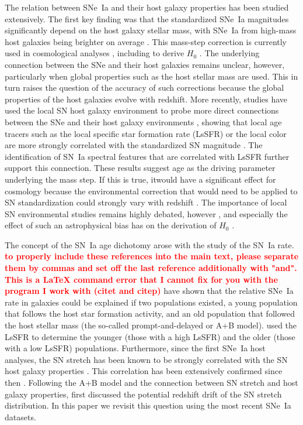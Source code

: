 \documentclass[]{aa}
\newcommand{\LEt}[1]{\textcolor{red}{\textbf{ #1}}}
\begin{document}
The relation between SNe~Ia and their host galaxy properties has been studied
extensively. The first key finding was that the standardized SNe~Ia magnitudes
significantly depend on the host galaxy stellar mass, with SNe~Ia from high-mass
host galaxies being brighter on average \cite[e.g.,][]{kelly2010, sullivan2010,
childress2013, betoule2014, kim19, smith2020}. This mass-step correction is
currently used in cosmological analyses \citep[e.g.,][]{betoule2014,
scolnic2018a}, including to derive $H_0$ \citep{riess2016, riess2019}. The underlying connection between the SNe and their host galaxies remains
unclear, however, particularly when global properties such as the host stellar
mass are used. This in turn raises the question of the accuracy of such corrections because
the global properties of the host galaxies evolve with redshift. More recently, studies have
used the local SN host galaxy environment to probe more direct connections
between the SNe and their host galaxy environments \citep{rigault2013}, showing
that local age tracers such as the local specific star formation rate (LsSFR) or
the local color are more strongly correlated with the standardized SN magnitude
\citep{roman2018, kim18, rigault2020}. The identification of SN~Ia spectral features that are correlated with LsSFR
\citep{nordin2018} further support this connection. These results suggest age as the driving parameter
underlying the mass step. If this is true, itwould have a significant effect for
cosmology because the environmental correction that would need to be applied to SN standardization
could strongly vary with redshift \citep{rigault2013, childress2014,
scolnic2018a}. The importance of local SN environmental studies remains
highly debated, however \cite[e.g.,][]{jones2015, jones2019}, and especially the effect of
such an astrophysical bias has on the derivation of $H_0$ \citep{jones2015,
riess2016, riess2018, rose2019}. 

The concept of the SN~Ia age dichotomy arose with the study of the SN~Ia rate.\LEt{to properly include these references into the main text, please separate them by commas and set off the last reference additionally with "and". This is a LaTeX command error that I cannot fix for you with the program I work with (citet and citep)}
\cite{mannucci2005, scannapieco2005, sullivan2006, smith2012} have shown that
the relative SNe~Ia rate in galaxies could be explained if two populations
existed, a young population that follows the host star formation activity, and an old population that
followed the host stellar mass (the so-called prompt-and-delayed or A+B
model). \cite{rigault2020} used the LsSFR to determine the younger
(those with a high LsSFR) and the older (those with a low LsSFR) populations.
Furthermore, since the first SNe~Ia host analyses, the SN stretch has been known
to be strongly correlated with the SN host galaxy properties \citep{hamuy1996,
hamuy2000}. This correlation has been extensively confirmed since then
\citep[e.g.,][]{neill2009, lampeitl2010, gupta2011, dandrea2011, pan2014}.
Following the A+B model and the connection between SN stretch and host
galaxy properties, \cite{howell2007} first discussed the potential redshift
drift of the SN stretch distribution. In this paper we revisit this question
using the most recent SNe~Ia datasets.
\end{document}
